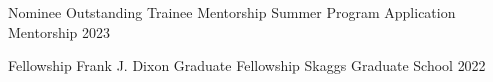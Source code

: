 
\begin{cvhonors}

  \cvhonor
    {Nominee} %
    {Outstanding Trainee Mentorship} %
    {Summer Program Application Mentorship} %
    {2023} %

  \cvhonor
    {Fellowship} %
    {Frank J. Dixon Graduate Fellowship} %
    {Skaggs Graduate School} %
    {2022} %

\end{cvhonors}
